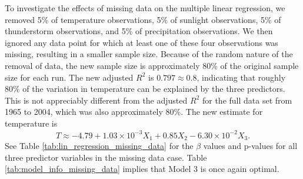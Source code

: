 To investigate the effects of missing data on the multiple linear regression, we removed 5\% of temperature observations, 5\% of sunlight observations, 5\% of thunderstorm observations, and 5\% of precipitation observations. We then ignored any data point for which at least one of these four observations was missing, resulting in a smaller sample size. Because of the random nature of the removal of data, the new sample size is approximately 80\% of the original sample size for each run. The new adjusted $R^{2}$ is $0.797 \approx 0.8$, indicating that roughly 80\% of the variation in temperature can be explained by the three predictors. This is not appreciably different from the adjusted $R^{2}$ for the full data set from 1965 to 2004, which was also approximately 80\%. The new estimate for temperature is $$\hat{T} \approx -4.79 + 1.03 \times 10^{-3}X_{1} + 0.85X_{2} - 6.30\times 10^{-2}X_{3}.$$ See Table \ref{tab:lin_regression_missing_data} for the $\beta$ values and p-values for all three predictor variables in the missing data case. Table \ref{tab:model_info_missing_data} implies that Model 3 is once again optimal.
